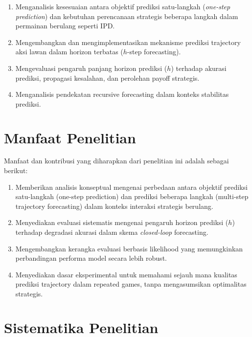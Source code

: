 \begin{enumerate}
    \item Menganalisis kesesuaian antara objektif prediksi satu-langkah (\textit{one-step prediction}) dan kebutuhan perencanaan strategis beberapa langkah dalam permainan berulang seperti IPD.

    \item Mengembangkan dan mengimplementasikan mekanisme prediksi trajectory aksi lawan dalam horizon terbatas ($h$-step forecasting).

    \item Mengevaluasi pengaruh panjang horizon prediksi ($h$) terhadap akurasi prediksi, propagasi kesalahan, dan perolehan payoff strategis.

    \item Menganalisis pendekatan recursive forecasting dalam konteks stabilitas prediksi.
\end{enumerate}

\section{Manfaat Penelitian}

Manfaat dan kontribusi yang diharapkan dari penelitian ini adalah sebagai berikut:

\begin{enumerate}

    \item Memberikan analisis konseptual mengenai perbedaan antara objektif prediksi satu-langkah (one-step prediction) dan prediksi beberapa langkah (multi-step trajectory forecasting) dalam konteks interaksi strategis berulang.

    \item Menyediakan evaluasi sistematis mengenai pengaruh horizon prediksi ($h$) terhadap degradasi akurasi dalam skema \textit{closed-loop} forecasting.

    \item Mengembangkan kerangka evaluasi berbasis likelihood yang memungkinkan perbandingan performa model secara lebih robust.

    \item Menyediakan dasar eksperimental untuk memahami sejauh mana kualitas prediksi trajectory dalam repeated games, tanpa mengasumsikan optimalitas strategis.
    
\end{enumerate}

\section{Sistematika Penelitian}

